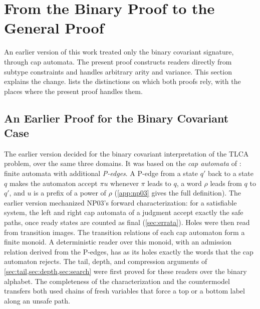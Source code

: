 \section{From the Binary Proof to the General Proof}
\label{sec:experience}

An earlier version of this work treated only the binary covariant signature,
through cap automata. The present proof constructs readers directly from
subtype constraints and handles arbitrary arity and variance. This section
explains the change.  lists the distinctions on which both
proofs rely, with the places where the present proof handles them.

\subsection{An Earlier Proof for the Binary Covariant Case}
\label{sec:earlier}
The earlier version decided \NSSE for the binary covariant interpretation
of the TLCA problem, over the same three domains. It was based on the
\emph{cap automata} of \citet{NiehrenPriesnitz03}: finite automata with
additional \emph{P-edges}. A P-edge from a state $q'$ back to a state $q$
makes the automaton accept $\pi u$ whenever $\pi$ leads to $q$, a word
$\rho$ leads from $q$ to $q'$, and $u$ is a prefix of a power of $\rho$
(\cref{app:np03} gives the full definition). The earlier version mechanized NP03's forward
characterization: for a satisfiable system, the left and right cap automata
of a judgment accept exactly the safe paths, once ready states are counted
as final (\cref{sec:errata}). Holes were then read from transition images.
The transition relations of each cap automaton form a finite monoid. A
deterministic reader over this monoid, with an admission relation derived
from the P-edges, has as its holes exactly the words that the cap automaton
rejects. The tail, depth, and compression arguments of
\cref{sec:tail,sec:depth,sec:search} were first proved for these readers
over the binary alphabet. The completeness of the characterization and the
countermodel transfers both used chains of fresh variables that force a top
or a bottom label along an unsafe path.

